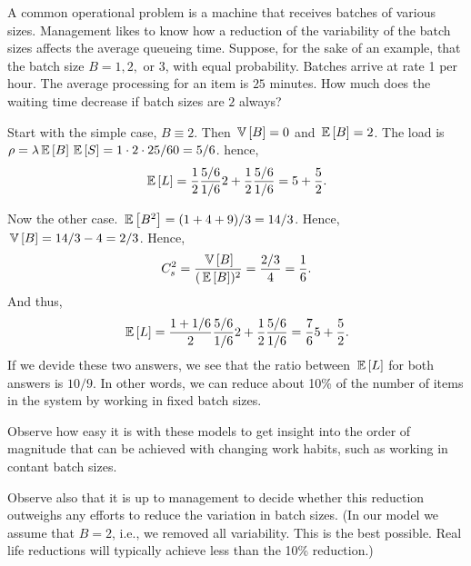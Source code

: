 \begin{question}
  A common operational problem is a machine that receives batches of
  various sizes. Management likes to know how a reduction of the
  variability of the batch sizes affects the average queueing time.
  Suppose, for the sake of an example, that the batch size $B=1,2,$ or
  $3$, with equal probability. Batches arrive at rate 1 per hour. The
  average processing for an item is $25$ minutes.  How much does the
  waiting time decrease if batch sizes are $2$ always?

  \begin{solution}
    Start with the simple case, $B\equiv 2$. Then $\,\mathbb{V}\left[B\right]=0$ and
    $\,\mathbb{E}\left[B\right] = 2$. The load is $\rho=\lambda \,\mathbb{E}\left[B\right] \,\mathbb{E}\left[S\right] = 1\cdot 2 \cdot 25/60 = 5/6$.  hence,
    \begin{equation*}
      \,\mathbb{E}\left[L\right] = \frac 12 \frac{5/6}{1/6} 2 + \frac 12 \frac{5/6}{1/6} = 5 + \frac52.
    \end{equation*}

Now the other case. $\,\mathbb{E}\left[B^2\right] = (1+4+9)/3 = 14/3$. Hence, $\,\mathbb{V}\left[B\right]=14/3 - 4=2/3$. Hence, 
\begin{equation*}
C_s^2=\frac{\,\mathbb{V}\left[B\right]}{(\,\mathbb{E}\left[B\right])^2} = \frac{2/3}4 = \frac 16.
\end{equation*}
And thus, 
    \begin{equation*}
      \,\mathbb{E}\left[L\right] = \frac {1+1/6}2 \frac{5/6}{1/6} 2 + \frac 12 \frac{5/6}{1/6} = \frac76 5 + \frac 52.
    \end{equation*}
    If we devide these two answers, we see that the ratio between
    $\,\mathbb{E}\left[L\right]$ for both answers is $10/9$. In other words, we can
    reduce about 10\% of the number of items in the system by working
    in fixed batch sizes. 

    Observe how easy it is with these models to get insight into the
    order of magnitude that can be achieved with changing work habits,
    such as working in contant batch sizes. 

    Observe also that it is up to management to decide whether this
    reduction outweighs any efforts to reduce the variation in batch
    sizes. (In our model we assume that $B=2$, i.e., we removed all
    variability. This is the best possible. Real life reductions will
    typically achieve less than the 10\% reduction.)
  \end{solution}
\end{question}

